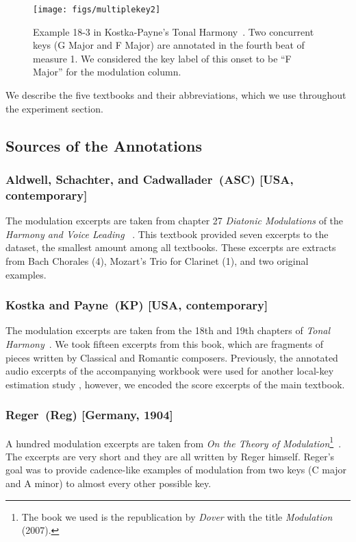 \documentclass[sigconf]{acmart}
\begin{document}
\begin{figure}[h]
  \centering
  \texttt{[image: figs/multiplekey2]}
  \caption{Example 18-3 in Kostka-Payne's Tonal Harmony~\cite{kostka2008tonal}. Two concurrent keys (G Major and F Major) are annotated in the fourth beat of measure 1. We considered the key label of this onset to be ``F Major'' for the modulation column.}
  \label{fig:multiplekeys}
\end{figure}

We describe the five textbooks and their abbreviations, which we use throughout the experiment section.

\subsection{Sources of the Annotations}

	\subsubsection{Aldwell, Schachter, and Cadwallader~(ASC) [USA, contemporary]}
	The modulation excerpts are taken from chapter 27 \emph{Diatonic Modulations} of the \emph{Harmony and Voice Leading} ~\cite{aldwell2018harmony}.
	This textbook provided seven excerpts to the dataset, the smallest amount among all textbooks. 
	These excerpts are extracts from Bach Chorales (4), Mozart's Trio for Clarinet (1), and two original examples.  
	
	\subsubsection{Kostka and Payne~(KP) [USA, contemporary]}
	The modulation excerpts are taken from the 18th and 19th chapters of \emph{Tonal Harmony}~\cite{kostka2008tonal}. 
	We took fifteen excerpts from this book, which are fragments of pieces written by Classical and Romantic composers. 
	Previously, the annotated audio excerpts of the accompanying workbook were used for another local-key estimation study \cite{izmirli_localized_2007}, however, we encoded the score excerpts of the main textbook.
	
	\subsubsection{Reger~(Reg) [Germany, 1904]}
	A hundred modulation excerpts are taken from \emph{On the Theory of Modulation}\footnote{The book we used is the republication by \emph{Dover} with the title \emph{Modulation} (2007).}~\cite{regermodulation}. 
	The excerpts are very short and they are all written by Reger himself. 
	Reger's goal was to provide cadence-like examples of modulation from two keys (C major and A minor) to almost every other possible key. 
	
\end{document}
